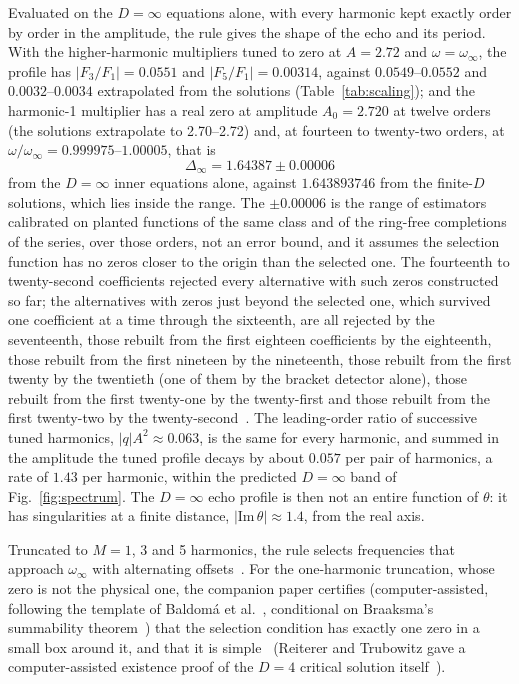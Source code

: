 \documentclass[aps,prd,onecolumn,superscriptaddress,nofootinbib,10pt]{revtex4-2}
\newcommand{\Dinf}{\Delta_\infty}
\begin{document}
Evaluated on the $D = \infty$ equations alone, with every harmonic kept exactly order by order in the amplitude, the rule
gives the shape of the echo and its period. With the higher-harmonic multipliers tuned to zero at $A = 2.72$ and
$\omega = \omega_\infty$, the profile has $|F_3/F_1| = 0.0551$ and $|F_5/F_1| = 0.00314$, against $0.0549$--$0.0552$ and
$0.0032$--$0.0034$ extrapolated from the solutions (Table~\ref{tab:scaling}); and the harmonic-1
multiplier has a real zero at amplitude $A_0 = 2.720$ at twelve orders (the solutions extrapolate to 2.70--2.72) and,
at fourteen to twenty-two orders, at $\omega/\omega_\infty = 0.999975$--$1.00005$, that is
\begin{equation}
\Dinf = 1.64387 \pm 0.00006
\end{equation}
from the $D = \infty$ inner equations alone, against $1.643893746$ from the finite-$D$ solutions, which lies inside
the range. The $\pm0.00006$ is the range of estimators calibrated on planted functions of the same class and of the
ring-free completions of the series, over those orders, not an error bound, and it assumes the selection function
has no zeros closer to the origin than the selected one. The fourteenth to twenty-second coefficients rejected every
alternative with such zeros constructed so far; the alternatives with zeros just beyond the selected one, which
survived one coefficient at a time through the sixteenth, are all rejected by the seventeenth, those rebuilt
from the first eighteen coefficients by the eighteenth, those rebuilt from the first nineteen by the
nineteenth, those rebuilt from the first twenty by the twentieth (one of them by the bracket detector
alone), those rebuilt from the first twenty-one by the twenty-first and those rebuilt from the first twenty-two by
the twenty-second~\cite{math}. The leading-order ratio of successive tuned harmonics, $|q|A^2 \approx 0.063$,
is the same for every harmonic, and summed in the amplitude the tuned profile decays by about $0.057$ per pair of
harmonics, a rate of $1.43$ per harmonic, within the predicted $D = \infty$ band of Fig.~\ref{fig:spectrum}. The
$D = \infty$ echo profile is then not an entire function of $\theta$: it has singularities at a finite distance,
$|\mathrm{Im}\,\theta| \approx 1.4$, from the real axis.

Truncated to $M = 1$, 3 and 5 harmonics, the rule selects frequencies that approach $\omega_\infty$ with alternating
offsets~\cite{math}. For the one-harmonic truncation, whose zero is not the physical one, the companion paper certifies
(computer-assisted, following the template of Baldom\'a et al.~\cite{BaldomaEtAl2023}, conditional on Braaksma's
summability theorem~\cite{Braaksma1992}) that the selection condition has exactly one zero in a small box around it, and
that it is simple~\cite[Thm.~A]{math} (Reiterer and Trubowitz gave a computer-assisted existence proof of the $D = 4$
critical solution itself~\cite{ReitererTrubowitz2019}).
\end{document}
